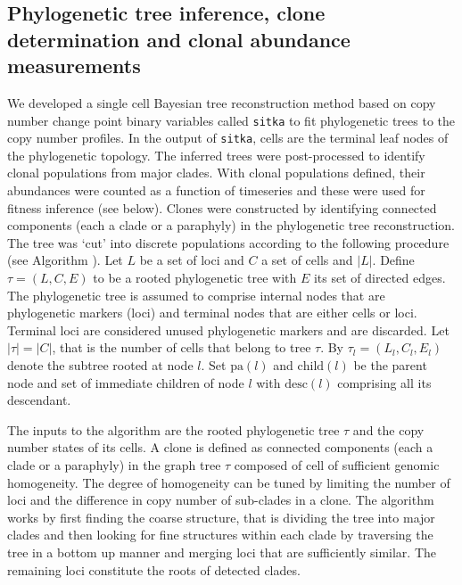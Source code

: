 \subsection{Phylogenetic tree inference, clone determination and clonal abundance measurements}

We developed a single cell Bayesian tree reconstruction method based on copy number change point binary variables called \texttt{sitka} \cite{dorri2020efficient} to fit phylogenetic trees to the copy number profiles.  
In the output of \texttt{sitka}, cells are the terminal leaf nodes of the phylogenetic topology.  
The inferred trees were post-processed to identify clonal populations from major clades. With clonal populations defined, their abundances were counted as a function of timeseries and these were used for fitness inference (see below). 
Clones were constructed by identifying connected components (each a clade or a paraphyly) in the phylogenetic tree reconstruction. The tree was `cut' into discrete populations according to the following procedure (see Algorithm \cite{salehi2020single}).
Let $L$ be a set of loci and $C$ a set of cells and ${\lvert}L{\rvert}$. 
Define $\tau = (L, C, E)$ to be a rooted phylogenetic tree with $E$ its set of directed edges.
The phylogenetic tree is assumed to comprise internal nodes that are phylogenetic markers (loci) and terminal nodes that are either cells or loci. 
Terminal loci are considered unused phylogenetic markers and are discarded. 
Let ${\lvert}\tau{\rvert} = {\lvert}C{\rvert}$, that is the number of cells that belong to tree $\tau$.
By $\tau_{l} = (L_l, C_l, E_l)$ denote the subtree rooted at node $l$.
Set $\text{pa}(l)$ and $\text{child}(l)$ be the parent node and set of immediate children of node $l$ with $\text{desc}(l)$ comprising all its descendant. 

The inputs to the algorithm are the rooted phylogenetic tree $\tau$ and the copy number states of its cells.
A clone is defined as connected components (each a clade or a paraphyly) in the graph tree $\tau$ composed of cell of sufficient genomic homogeneity. 
The degree of homogeneity can be tuned by limiting the number of loci and the difference in copy number of sub-clades in a clone. 
The algorithm works by first finding the coarse structure, that is dividing the tree into major clades and then looking for fine structures within each clade by traversing the tree in a bottom up manner and merging loci that are sufficiently similar.
The remaining loci constitute the roots of detected clades.

